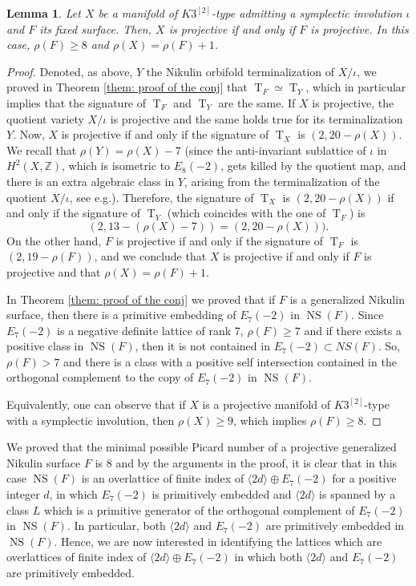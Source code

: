 \documentclass{amsart}
\newtheorem{lemma}[thm]{Lemma}
\theoremstyle{definition}
\numberwithin{equation}{section}
\numberwithin{equation}{section} \theoremstyle{definition}
\DeclareMathOperator{\NS}{NS}
\DeclareMathOperator{\T}{T}
\newcommand\Z{\mathbb{Z}}
\begin{document}
\begin{lemma}\label{lemma: X proj iff F proj and rho(F)} Let $X$ be a manifold of $K3^{[2]}$-type admitting a symplectic involution $\iota$ and $F$ its fixed surface. Then, $X$ is projective if and only if $F$ is projective. In this case, $\rho(F)\geq 8$ and $\rho(X)=\rho(F)+1$.\end{lemma}
\begin{proof} Denoted, as above, $Y$ the Nikulin orbifold terminalization of $X/\iota$, we proved in Theorem \ref{them: proof of the conj} that $\T_F\simeq \T_Y$, which in particular implies that the signature of $\T_F$ and $\T_Y$ are the same. 
If $X$ is projective, the quotient variety $X/\iota$ is projective and the same holds true for its terminalization $Y$. Now, $X$ is projective if and only if the signature of $\T_X$ is $(2,20-\rho(X))$. We recall that $\rho(Y)=\rho(X)-7$ (since the anti-invariant sublattice of $\iota$  in $H^2(X,\Z)$, which is isometric to $E_8(-2)$, gets killed by the quotient map, and there is an extra algebraic class in $Y$, arising from the terminalization of the quotient $X/\iota$, see e.g.\cite{CGKK}). Therefore, the signature of $\T_X$ is $(2,20-\rho(X))$ if and only if the signature of $\T_Y$ (which coincides with the one of $\T_F$) is $$(2, 13-(\rho(X)-7))=(2,20-\rho(X))).$$ On the other hand, $F$ is projective if and only if the signature of $\T_F$ is $(2,19-\rho(F))$, and we conclude that $X$ is projective if and only if $F$ is projective and that  $\rho(X)=\rho(F)+1$.

In Theorem \ref{them: proof of the conj} we proved that if $F$ is a generalized Nikulin surface, then there is a primitive embedding  of $E_7(-2)$ in $\NS(F)$. Since $E_7(-2)$ is a negative definite lattice of rank 7, $\rho(F)\geq 7$ and if there exists a positive class in $\NS(F)$, then it is not contained in $E_7(-2)\subset NS(F)$. So, $\rho(F)>7$ and there is a class with a positive self intersection contained in the orthogonal complement to the copy of  $E_7(-2)$ in $\NS(F)$.

Equivalently, one can observe that if $X$ is a projective manifold of $K3^{[2]}$-type with a symplectic involution, then $\rho(X)\geq 9$, which implies $\rho(F)\geq 8$.\end{proof}


We proved that the minimal possible Picard number of a projective generalized Nikulin surface $F$ is $8$ and by the arguments in the proof, it is clear that in this case $\NS(F)$ is an overlattice of finite index of $\langle 2d\rangle \oplus E_7(-2)$ for a positive integer $d$, in which $E_7(-2)$ is primitively embedded and $\langle 2d\rangle$ is spanned by a class $L$ which is a primitive generator of the orthogonal complement of $E_7(-2)$ in $\NS(F)$. In particular, both $\langle 2d\rangle$ and $E_7(-2)$ are primitively embedded in $\NS(F)$. Hence, we are now interested in identifying the lattices which are overlattices of finite index of $\langle 2d\rangle \oplus E_7(-2)$ in which both $\langle 2d\rangle$ and $E_7(-2)$ are primitively embedded. 
\end{document}
